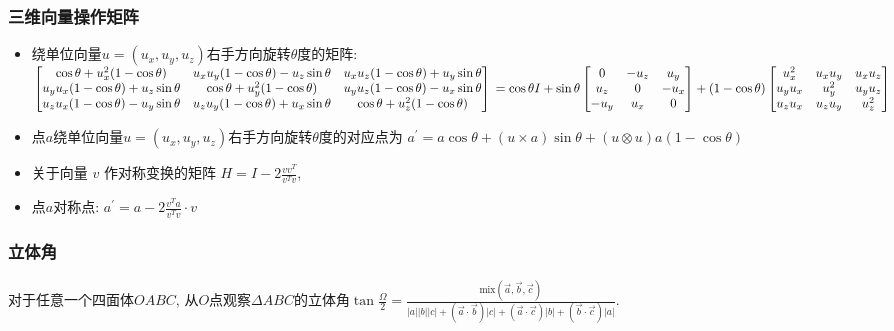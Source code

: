 \documentclass[landscape,a4paper]{article}
\begin{document}
\begin{spacing}{0.3}
\begin{multicols}{2}
\subsubsection{三维向量操作矩阵}
  \begin{itemize}
  \item 绕单位向量$u = (u_x, u_y, u_z)$右手方向旋转$\theta$度的矩阵: \\
    $
    \begin{bmatrix}
      \cos\theta + u_x^2 (1 - \cos\theta)    &    u_x u_y (1 - \cos\theta) - u_z \sin\theta    &    u_x u_z (1 - \cos\theta) + u_y \sin\theta \\
    u_y u_x (1 - \cos\theta) + u_z \sin\theta    &    \cos\theta + u_y^2 (1 - \cos\theta)    &    u_y u_z (1 - \cos\theta) - u_x \sin\theta \\
    u_z u_x (1 - \cos\theta) - u_y \sin\theta    &    u_z u_y (1 - \cos\theta) + u_x \sin\theta    &    \cos\theta + u_z^2 (1 - \cos\theta)
  \end{bmatrix} \\
  = \cos\theta I
  + \sin\theta
  \begin{bmatrix}
    0    &    -u_z    &    u_y \\
    u_z    &    0    &    -u_x \\
    -u_y    &    u_x    &    0
  \end{bmatrix}
  + (1 - \cos\theta)
  \begin{bmatrix}
    u_x ^ 2    &    u_x u_y    &    u_x u_z \\
    u_y u_x    &    u_y ^ 2    &    u_y u_z \\
    u_z u_x    &    u_z u_y    &    u_z ^ 2
  \end{bmatrix}
  $
  \item 点$a$绕单位向量$u = (u_x, u_y, u_z)$右手方向旋转$\theta$度的对应点为
  $a^\prime = a \cos\theta + (u \times a) \sin\theta + (u \otimes u) a (1 - \cos\theta)$
  \item 关于向量 $v$ 作对称变换的矩阵 $H = I - 2 \frac{v v^T}{v^T v}$,
  \item 点$a$对称点: $a^\prime = a - 2 \frac{v^T a}{v^T v} \cdot v$
  \end{itemize}
\subsubsection{立体角}
  对于任意一个四面体$OABC$,
  从$O$点观察$\Delta ABC$的立体角$\tan{\frac{\Omega}{2}} =
  \frac{\textrm{mix}(\overrightarrow{a}, \overrightarrow{b}, \overrightarrow{c}) }{
  |a||b||c|
  + (\overrightarrow{a} \cdot \overrightarrow{b}) |c|
  + (\overrightarrow{a} \cdot \overrightarrow{c}) |b|
  + (\overrightarrow{b} \cdot \overrightarrow{c}) |a|
}$.
	

\end{multicols}
\end{spacing}
\end{document}
